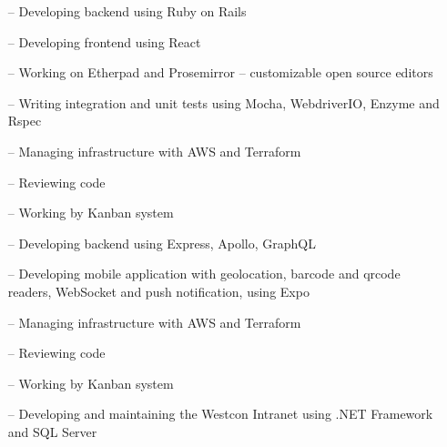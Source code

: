 

\medskip

\begin{itemize}
    \setlength{\itemindent}{1em}
    \item[--] {Developing backend using Ruby on Rails}
    \item[--] {Developing frontend using React}
    \item[--] {Working on Etherpad and Prosemirror -- customizable open source editors}
    \item[--] {Writing integration and unit tests using Mocha, WebdriverIO, Enzyme and Rspec}
    \item[--] {Managing infrastructure with AWS and Terraform}
    \item[--] {Reviewing code}
    \item[--] {Working by Kanban system}
\end{itemize}

\cveventseparator


\medskip

\begin{itemize}
    \setlength{\itemindent}{1em}
    \item[--] {Developing backend using Express, Apollo, GraphQL}
    \item[--] {Developing mobile application with geolocation, barcode and qrcode readers, WebSocket and push notification, using Expo}
    \item[--] {Managing infrastructure with AWS and Terraform}
    \item[--] {Reviewing code}
    \item[--] {Working by Kanban system}
\end{itemize}

\cveventseparator


\begin{itemize}
  \setlength{\itemindent}{1em}
\item[--] {Developing and maintaining the Westcon Intranet using .NET Framework and SQL Server}
\end{itemize}

\cveventseparator

